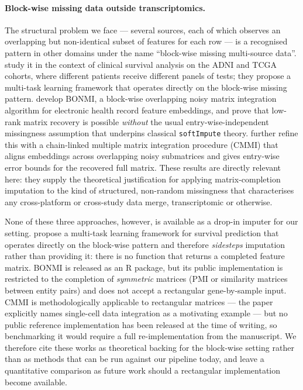 \documentclass[11pt,a4paper]{article}
\begin{document}
\paragraph{Block-wise missing data outside transcriptomics.}
The structural problem we face --- several sources, each of
which observes an overlapping but non-identical subset of
features for each row --- is a recognised pattern in other
domains under the name ``block-wise missing multi-source
data''. \citet{Li2019} study it in the context of clinical
survival analysis on the ADNI and TCGA cohorts, where different
patients receive different panels of tests; they propose a
multi-task learning framework that operates directly on the
block-wise missing pattern. \citet{Zhou2021} develop BONMI, a
block-wise overlapping noisy matrix integration algorithm for
electronic health record feature embeddings, and prove that
low-rank matrix recovery is possible \emph{without} the usual
entry-wise-independent missingness assumption that underpins
classical \texttt{softImpute} theory. \citet{Zheng2024} further refine
this with a chain-linked multiple matrix integration procedure
(CMMI) that aligns embeddings across overlapping noisy
submatrices and gives entry-wise error bounds for the recovered
full matrix. These results are directly relevant here: they
supply the theoretical justification for applying
matrix-completion imputation to the kind of structured,
non-random missingness that characterises any cross-platform or
cross-study data merge, transcriptomic or otherwise.

None of these three approaches, however, is available as a
drop-in imputer for our setting. \citet{Li2019} propose a
multi-task learning framework for survival prediction that
operates directly on the block-wise pattern and therefore
\emph{sidesteps} imputation rather than providing it: there is
no function that returns a completed feature matrix. BONMI
\citep{Zhou2021} is released as an R package, but its public
implementation is restricted to the completion of
\emph{symmetric} matrices (PMI or similarity matrices between
entity pairs) and does not accept a rectangular gene-by-sample
input. CMMI \citep{Zheng2024} is methodologically applicable to
rectangular matrices --- the paper explicitly names single-cell
data integration as a motivating example --- but no public
reference implementation has been released at the time of
writing, so benchmarking it would require a full
re-implementation from the manuscript. We therefore cite these
works as theoretical backing for the block-wise setting rather
than as methods that can be run against our pipeline today, and
leave a quantitative comparison as future work should a
rectangular implementation become available.
\end{document}
